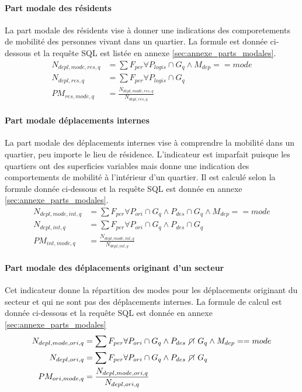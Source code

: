     \paragraph{Part modale des résidents} La part modale des résidents vise à donner une indications des comporetements de mobilité des personnes vivant dans un quartier. La formule est donnée ci-dessous et la requête SQL est listée en annexe \ref{sec:annexe_parts_modales}.
    \begin{align}
        N_{depl,mode,res,q}  &= \sum{F_{per}} \forall P_{logis} \cap G_q \wedge M_{dep} == mode\\
        N_{depl,res,q} &= \sum{F_{per}} \forall P_{logis} \cap G_q \\
        PM_{res,mode,q} &= \frac{N_{depl,mode,res,q}}{N_{depl,res,q}}
    \end{align}
    \paragraph{Part modale déplacements internes} La part modale des déplacements internes vise à comprendre la mobilité dans un quartier, peu importe le lieu de résidence. L'indicateur est imparfait puisque les quartiers ont des superficies variables mais donne une indication des comportements de mobilité à l'intérieur d'un quartier. Il est calculé selon la formule donnée ci-dessous et la requête SQL est donnée en annexe \ref{sec:annexe_parts_modales}.
    \begin{align}
        N_{depl,mode,int,q} &= \sum{F_{per}} \forall P_{ori} \cap G_q \wedge P_{des} \cap G_q \wedge M_{dep}==mode \\
        N_{depl,int,q} &= \sum{F_{per}} \forall P_{ori} \cap G_q \wedge P_{des} \cap G_q \\
        PM_{int,mode,q} &= \frac{N_{depl,mode,int,q}}{N_{depl,int,q}}
    \end{align}
    \paragraph{Part modale des déplacements originant d'un secteur} Cet indicateur donne la répartition des modes pour les déplacements originant du secteur et qui ne sont pas des déplacements internes. La formule de calcul est donnée ci-dessous et la requête SQL est donnée en annexe \ref{sec:annexe_parts_modales}
    \begin{align}
        N_{depl,mode,ori,q} &= \sum{F_{per}} \forall P_{ori} \cap G_q \wedge P_{des} \disjoint G_q \wedge M_{dep}==mode \\
        N_{depl,ori,q} &= \sum{F_{per}} \forall P_{ori} \cap G_q \wedge P_{des} \disjoint G_q \\
        PM_{ori,mode,q} &= \frac{N_{depl,mode,ori,q}}{N_{depl,ori,q}}
    \end{align}
